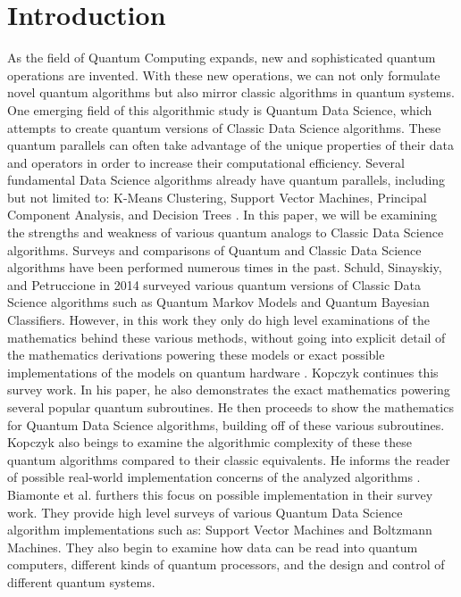 \documentclass[conference]{IEEEtran}
\begin{document}
\section{Introduction}
As the field of Quantum Computing expands, new and sophisticated quantum operations are invented. With these new operations, we can not only formulate novel quantum algorithms but also mirror classic algorithms in quantum systems. One emerging field of this algorithmic study is Quantum Data Science, which attempts to create quantum versions of Classic Data Science algorithms. These quantum parallels can often take advantage of the unique properties of their data and operators in order to increase their computational efficiency. Several fundamental Data Science algorithms already have quantum parallels, including but not limited to: K-Means Clustering, Support Vector Machines, Principal Component Analysis, and Decision Trees \cite{b1} \cite{b2} \cite{b3} \cite{b4}. 
\newline
\indent In this paper, we will be examining the strengths and weakness of various quantum analogs to Classic Data Science algorithms. Surveys and comparisons of Quantum and Classic Data Science algorithms have been performed numerous times in the past. Schuld, Sinayskiy, and Petruccione in 2014 surveyed various quantum versions of Classic Data Science algorithms such as Quantum Markov Models and Quantum Bayesian Classifiers. However, in this work they only do high level examinations of the mathematics behind these various methods, without going into explicit detail of the mathematics derivations powering these models or exact possible implementations of the models on quantum hardware \cite{b5}.
\newline
\indent Kopczyk continues this survey work. In his paper, he also demonstrates the exact mathematics powering several popular quantum subroutines. He then proceeds to show the mathematics for Quantum Data Science algorithms, building off of these various subroutines. Kopczyk also beings to examine the algorithmic complexity of these these quantum algorithms compared to their classic equivalents. He informs the reader of possible real-world implementation concerns of the analyzed algorithms \cite{b6}. 
\newline
\indent Biamonte et al. furthers this focus on possible implementation in their survey work. They provide high level surveys of various Quantum Data Science algorithm implementations such as: Support Vector Machines and Boltzmann Machines. They also begin to examine how data can be read into quantum computers, different kinds of quantum processors, and the design and control of different quantum systems.\cite{b7}
\end{document}
